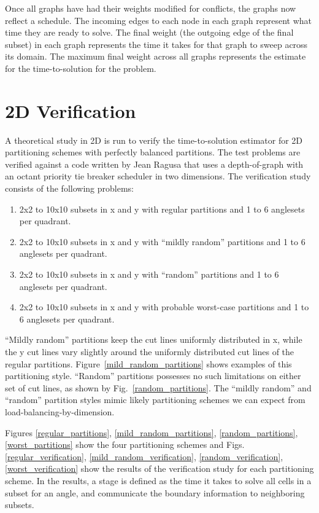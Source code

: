 Once all graphs have had their weights modified for conflicts, the graphs now reflect a schedule. The incoming edges to each node in each graph represent what time they are ready to solve. The final weight (the outgoing edge of the final subset) in each graph represents the time it takes for that graph to sweep across its domain. The maximum final weight across all graphs represents the estimate for the time-to-solution for the problem.

\section{2D Verification}

A theoretical study in 2D is run to verify the time-to-solution estimator for 2D partitioning schemes with perfectly balanced partitions. The test problems are verified against a code written by Jean Ragusa that uses a depth-of-graph with an octant priority tie breaker scheduler in two dimensions. The verification study consists of the following problems:
\begin{enumerate}
	\item 2x2 to 10x10 subsets in x and y with regular partitions and 1 to 6 anglesets per quadrant.
	\item 2x2 to 10x10 subsets in x and y with ``mildly random'' partitions and 1 to 6 anglesets per quadrant.
	\item  2x2 to 10x10 subsets in x and y with ``random'' partitions and 1 to 6 anglesets per quadrant.
	\item  2x2 to 10x10 subsets in x and y with probable worst-case partitions and 1 to 6 anglesets per quadrant.
\end{enumerate}

``Mildly random'' partitions keep the cut lines uniformly distributed in x, while the y cut lines vary slightly around the uniformly distributed cut lines of the regular partitions. Figure~\ref{mild_random_partitions} shows examples of this partitioning style. ``Random'' partitions possesses no such limitations on either set of cut lines, as shown by Fig.~\ref{random_partitions}. The ``mildly random'' and ``random'' partition styles mimic likely partitioning schemes we can expect from load-balancing-by-dimension.

Figures \ref{regular_partitions}, \ref{mild_random_partitions}, \ref{random_partitions}, \ref{worst_partitions} show the four partitioning schemes and Figs. \ref{regular_verification}, \ref{mild_random_verification}, \ref{random_verification}, \ref{worst_verification} show the results of the verification study for each partitioning scheme. In the results, a stage is defined as the time it takes to solve all cells in a subset for an angle, and communicate the boundary information to neighboring subsets.

